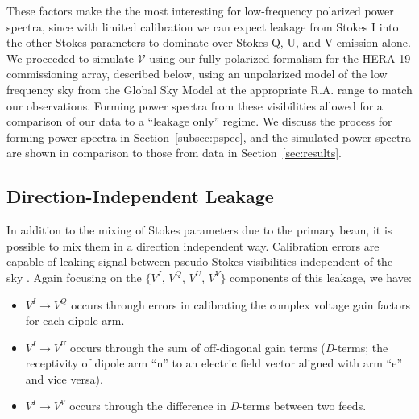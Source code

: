 \documentclass[twocolumn, trackchanges]{aastex61}
\begin{document}

These factors make the  the most interesting for low-frequency polarized power spectra, since with limited calibration we can expect leakage from Stokes I into the other Stokes parameters to dominate over Stokes Q, U, and V emission alone. We proceeded to simulate $\mathcal{V}$ using our fully-polarized formalism for the HERA-19 commissioning array, described below, using an unpolarized model of the low frequency sky from the Global Sky Model \citep[GSM;][]{GSM.08, pygsm, GSM.17} at the appropriate R.A. range to match our observations. Forming power spectra from these visibilities allowed for a comparison of our data to a ``leakage only'' regime. We discuss the process for forming power spectra in Section~\ref{subsec:pspec}, and the simulated power spectra are shown in comparison to those from data in Section~\ref{sec:results}.

\subsection{Direction-Independent Leakage}
\label{subsec:DI-Leak}

In addition to the mixing of Stokes parameters due to the primary beam, it is possible to mix them in a direction independent way. Calibration errors are capable of leaking signal between pseudo-Stokes visibilities independent of the sky \citep{TMS}. Again focusing on the $\{V^I,\,V^Q,\,V^U,\,V^V\}$ components of this leakage, we have:
\begin{itemize}
\item $V^I \rightarrow V^Q$ occurs through errors in calibrating the complex voltage gain factors for each dipole arm.
\item $V^I \rightarrow V^U$ occurs through the sum of off-diagonal gain terms (\textit{D}-terms; the receptivity of dipole arm ``n'' to an electric field vector aligned with arm ``e'' and vice versa).
\item $V^I \rightarrow V^V$ occurs through the difference in \textit{D}-terms between two feeds.
\end{itemize}
\end{document}
